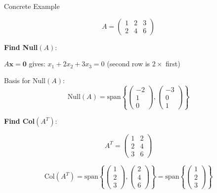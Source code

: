 \documentclass[10pt]{beamer}
\theoremstyle{definition}
\newcommand{\x}[1]{\alert{\textbf{#1}}}
\begin{document}
\begin{frame}{Concrete Example}

$$A = \begin{pmatrix} 1 & 2 & 3 \\ 2 & 4 & 6 \end{pmatrix}$$

\x{Find Null$(A)$}:

$A\mathbf{x} = \mathbf{0}$ gives: $x_1 + 2x_2 + 3x_3 = 0$ (second row is $2 \times$ first)

Basis for Null$(A)$:
$$\text{Null}(A) = \text{span}\left\{\begin{pmatrix} -2\\1\\0 \end{pmatrix}, \begin{pmatrix} -3\\0\\1 \end{pmatrix}\right\}$$

\x{Find Col$(A^T)$}:

$$A^T = \begin{pmatrix} 1 & 2 \\ 2 & 4 \\ 3 & 6 \end{pmatrix}$$

$$\text{Col}(A^T) = \text{span}\left\{\begin{pmatrix} 1\\2\\3 \end{pmatrix}, \begin{pmatrix} 2\\4\\6 \end{pmatrix}\right\} = \text{span}\left\{\begin{pmatrix} 1\\2\\3 \end{pmatrix}\right\}$$

\end{frame}
\end{document}
